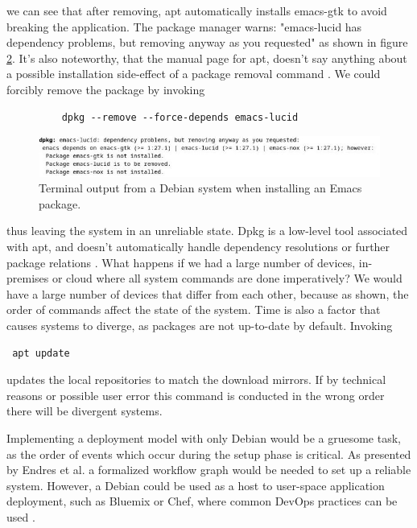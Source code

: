 we can see that after removing, apt automatically installs emacs-gtk
to avoid breaking the application. The package manager warns:
"emacs-lucid has dependency problems, but removing anyway as you
requested" as shown in figure \ref{deb_remove}. It's also noteworthy,
that the manual page for apt, doesn't say anything about a possible
installation side-effect of a package removal command
\cite{ubuntuUbuntuManpage}.  We could forcibly remove the package by
invoking
\begin{figure}[H]\label{dpkgsnippet}
\begin{lstlisting} 
    dpkg --remove --force-depends emacs-lucid
\end{lstlisting}
\end{figure}
\begin{figure}\label{deb_remove}
\includegraphics[scale=2.0]{latex/kuvat/cropped_apt_output.jpg}
\caption{Terminal output from a Debian system when installing an Emacs package.}
\end{figure}
thus leaving the system in an unreliable state. Dpkg is a low-level
tool associated with apt, and doesn't automatically handle dependency
resolutions or further package relations
\cite{thiruvathukal2004gentoo}. What happens if we had a large number
of devices, in-premises or cloud where all system commands are done
imperatively? We would have a large number of devices that differ from
each other, because as shown, the order of commands affect the state
of the system. Time is also a factor that
causes systems to diverge, as packages are not up-to-date by
default. Invoking \begin{lstlisting} apt update
\end{lstlisting}
updates the local repositories to match the download mirrors. If by
technical reasons or possible user error this command is conducted in
the wrong order there will be divergent systems.

Implementing a deployment model with only Debian would be a gruesome
task, as the order of events which occur during the setup phase is
critical. As presented by Endres et al. a formalized workflow graph
would be needed to set up a reliable system. However, a Debian could
be used as a host to user-space application deployment, such as
Bluemix or Chef, where common DevOps practices can be used
\cite{endres2017declarative}.



